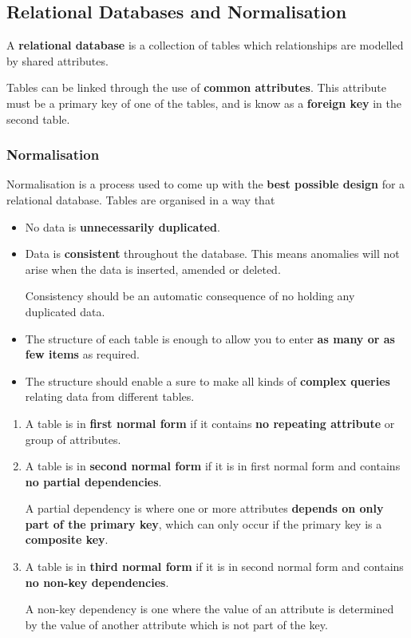 \subsection{Relational Databases and Normalisation}

A \textbf{relational database} is a collection of tables which relationships are modelled by shared attributes.

Tables can be linked through the use of \textbf{common attributes}. This attribute must be a primary key of one of the tables, and is know as a \textbf{foreign key} in the second table.

\subsubsection*{Normalisation}

Normalisation is a process used to come up with the \textbf{best possible design} for a relational database. Tables are organised in a way that
\begin{itemize}
    \item No data is \textbf{unnecessarily duplicated}.
    \item Data is \textbf{consistent} throughout the database. This means anomalies will not arise when the data is inserted, amended or deleted.

        Consistency should be an automatic consequence of no holding any duplicated data.
    \item The structure of each table is enough to allow you to enter \textbf{as many or as few items} as required.
    \item The structure should enable a sure to make all kinds of \textbf{complex queries} relating data from different tables.
\end{itemize}

\begin{enumerate}
    \item A table is in \textbf{first normal form} if it contains \textbf{no repeating attribute} or group of attributes.
    \item A table is in \textbf{second normal form} if it is in first normal form and contains \textbf{no partial dependencies}.

        A partial dependency is where one or more attributes \textbf{depends on only part of the primary key}, which can only occur if the primary key is a \textbf{composite key}.
    \item A table is in \textbf{third normal form} if it is in second normal form and contains \textbf{no non-key dependencies}.

        A non-key dependency is one where the value of an attribute is determined by the value of another attribute which is not part of the key.
\end{enumerate}


